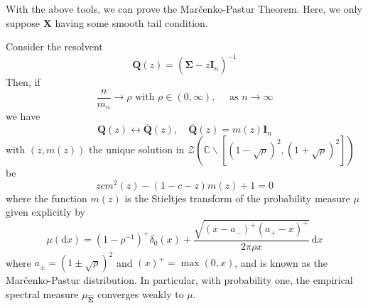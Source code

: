 With the above tools, we can prove the Marčenko-Pastur Theorem. Here, we only suppose $\mathbf{X}$ having some smooth tail condition.
\begin{theorem} \label{thm:marcenko-pastur-theorem}
    Consider the resolvent
    \begin{equation*}
        \mathbf{Q}(z)=\left(\widehat{\boldsymbol{\Sigma}}-z\mathbf{I}_{n}\right)^{-1}
    \end{equation*}
    Then, if
    \begin{equation*}
        \frac{n}{m_{n}}\rightarrow\rho\text{ with }\rho\in(0,\infty),\quad\text{ as }n\rightarrow\infty
    \end{equation*}
    we have
    \begin{equation*}
        \mathbf{Q}(z)\leftrightarrow\overline{\mathbf{Q}}(z),\quad\overline{\mathbf{Q}}(z)=m(z)\mathbf{I}_{n}
    \end{equation*}
    with $(z,m(z))$ the unique solution in $\mathcal{Z}\left(\mathbb{C}\backslash\left[(1-\sqrt{\rho})^{2},(1+\sqrt{\rho})^{2}\right]\right)$ be
    \begin{equation*}
        zcm^{2}(z)-(1-c-z)m(z)+1=0
    \end{equation*}
    where the function $m(z)$ is the Stieltjes transform of the probability measure $\mu$ given explicitly by
    \begin{equation*}
        \mu(\mathrm{d}x)=\left(1-\rho^{-1}\right)^{+}\delta_{0}(x)+\frac{\sqrt{\left(x-a_{-}\right)^{+}\left(a_{+}-x\right)^{+}}}{2\pi\rho x}\,\mathrm{d}x
    \end{equation*}
    where $a_{\pm}=(1 \pm \sqrt{\rho})^{2}$ and $(x)^{+}=\max (0, x)$, and is known as the Marčenko-Pastur distribution. In particular, with probability one, the empirical spectral measure $\mu_{\widehat{\boldsymbol{\Sigma}}}$ converges weakly to $\mu $.
\end{theorem}

